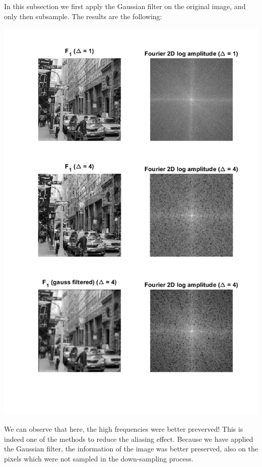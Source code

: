 \documentclass[a4paper]{iacas}
\begin{document}
\subsection{}
In this subsection we first apply the Gaussian filter on the original image, and only then subsample. The results are the following:

\vskip 0.1in
\begin{minipage}{1\textwidth}
\centering
	\includegraphics[scale=0.7]{imgs/q1_7.png}
\end{minipage}
\vskip 0.1in

We can observe that here, the high frequencies were better preverved! This is indeed one of the methods to reduce the aliasing effect. Because we have applied the Gaussian filter, the information of the image was better preserved, also on the pixels which were not sampled in the down-sampling process. 
\end{document}
